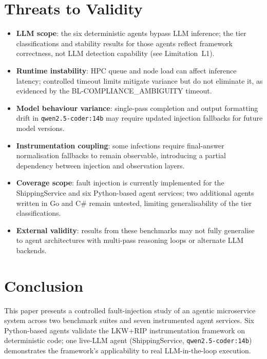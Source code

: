 \documentclass[conference]{IEEEtran}
\begin{document}
\section{Threats to Validity}

\begin{itemize}
  \item \textbf{LLM scope}: the six deterministic agents bypass LLM inference;
        the tier classifications and stability results for those agents reflect
        framework correctness, not LLM detection capability (see Limitation~L1).
  \item \textbf{Runtime instability}: HPC queue and node load can affect
        inference latency; controlled timeout limits mitigate variance but do
        not eliminate it, as evidenced by the BL-COMPLIANCE\_AMBIGUITY timeout.
  \item \textbf{Model behaviour variance}: single-pass completion and output
        formatting drift in \texttt{qwen2.5-coder:14b} may require updated
        injection fallbacks for future model versions.
  \item \textbf{Instrumentation coupling}: some infections require final-answer
        normalisation fallbacks to remain observable, introducing a partial
        dependency between injection and observation layers.
  \item \textbf{Coverage scope}: fault injection is currently implemented for
        the ShippingService and six Python-based agent services; two additional
        agents written in Go and C\# remain untested, limiting generalisability
        of the tier classifications.
  \item \textbf{External validity}: results from these benchmarks may not
        fully generalise to agent architectures with multi-pass reasoning loops
        or alternate LLM backends.
\end{itemize}

\clearpage  %
\section{Conclusion}

This paper presents a controlled fault-injection study of an agentic
microservice system across two benchmark suites and seven instrumented agent
services. Six Python-based agents validate the LKW+RIP instrumentation framework
on deterministic code; one live-LLM agent (ShippingService,
\texttt{qwen2.5-coder:14b}) demonstrates the framework's applicability to
real LLM-in-the-loop execution.
\end{document}
